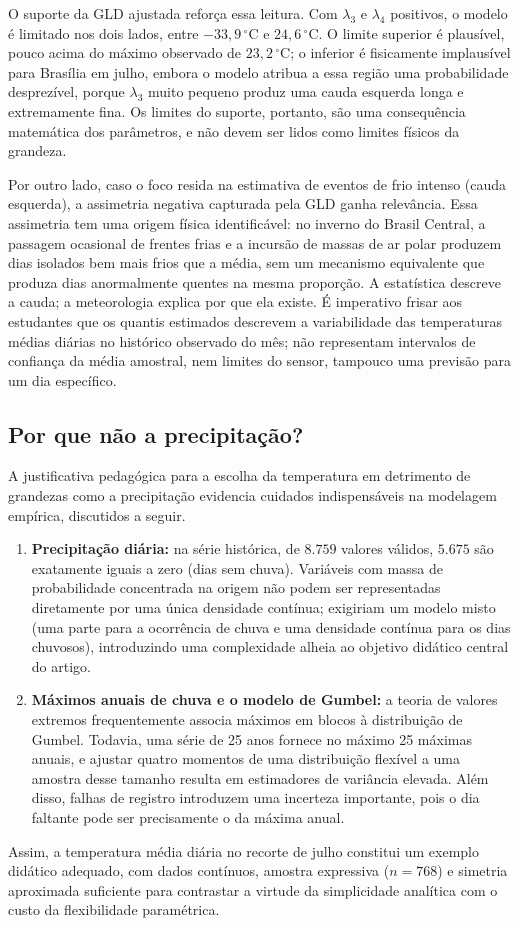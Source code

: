 O suporte da GLD ajustada reforça essa leitura. Com $\lambda_3$ e $\lambda_4$ positivos, o modelo é limitado nos dois lados, entre $-33,9\,^\circ\text{C}$ e $24,6\,^\circ\text{C}$. O limite superior é plausível, pouco acima do máximo observado de $23,2\,^\circ\text{C}$; o inferior é fisicamente implausível para Brasília em julho, embora o modelo atribua a essa região uma probabilidade desprezível, porque $\lambda_3$ muito pequeno produz uma cauda esquerda longa e extremamente fina. Os limites do suporte, portanto, são uma consequência matemática dos parâmetros, e não devem ser lidos como limites físicos da grandeza.

Por outro lado, caso o foco resida na estimativa de eventos de frio intenso (cauda esquerda), a assimetria negativa capturada pela GLD ganha relevância. Essa assimetria tem uma origem física identificável: no inverno do Brasil Central, a passagem ocasional de frentes frias e a incursão de massas de ar polar produzem dias isolados bem mais frios que a média, sem um mecanismo equivalente que produza dias anormalmente quentes na mesma proporção. A estatística descreve a cauda; a meteorologia explica por que ela existe. É imperativo frisar aos estudantes que os quantis estimados descrevem a variabilidade das temperaturas médias diárias no histórico observado do mês; não representam intervalos de confiança da média amostral, nem limites do sensor, tampouco uma previsão para um dia específico.

\subsection{Por que não a precipitação?}

A justificativa pedagógica para a escolha da temperatura em detrimento de grandezas como a precipitação evidencia cuidados indispensáveis na modelagem empírica, discutidos a seguir.

\begin{enumerate}
    \item \textbf{Precipitação diária:} na série histórica, de $8.759$ valores válidos, $5.675$ são exatamente iguais a zero (dias sem chuva). Variáveis com massa de probabilidade concentrada na origem não podem ser representadas diretamente por uma única densidade contínua; exigiriam um modelo misto (uma parte para a ocorrência de chuva e uma densidade contínua para os dias chuvosos), introduzindo uma complexidade alheia ao objetivo didático central do artigo.
    \item \textbf{Máximos anuais de chuva e o modelo de Gumbel:} a teoria de valores extremos frequentemente associa máximos em blocos à distribuição de Gumbel. Todavia, uma série de 25 anos fornece no máximo 25 máximas anuais, e ajustar quatro momentos de uma distribuição flexível a uma amostra desse tamanho resulta em estimadores de variância elevada. Além disso, falhas de registro introduzem uma incerteza importante, pois o dia faltante pode ser precisamente o da máxima anual.
\end{enumerate}

Assim, a temperatura média diária no recorte de julho constitui um exemplo didático adequado, com dados contínuos, amostra expressiva ($n = 768$) e simetria aproximada suficiente para contrastar a virtude da simplicidade analítica com o custo da flexibilidade paramétrica.

